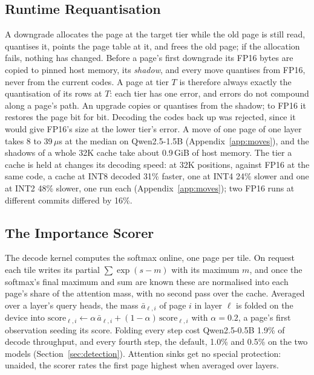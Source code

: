 \documentclass{article}
\begin{document}
\subsection{Runtime Requantisation}
\label{sec:requantisation}

A downgrade allocates the page at the target tier while the old page is still
read, quantises it, points the page table at it, and frees the old page; if
the allocation fails, nothing has changed. Before a page's first downgrade its
FP16 bytes are copied to pinned host memory, its \textit{shadow}, and every
move quantises from FP16, never from the current codes. A page at tier $T$ is
therefore always exactly the quantisation of its rows at $T$: each tier has one
error, and errors do not compound along a page's path. An upgrade copies or
quantises from the shadow; to FP16 it restores the page bit for bit. Decoding
the codes back up was rejected, since it would give FP16's size at the lower
tier's error. A move of one page of one layer takes 8 to 39\,$\mu$s at the
median on Qwen2.5-1.5B (Appendix~\ref{app:moves}), and the shadows of a whole
32K cache take about 0.9\,GiB of host memory. The tier a cache is held at
changes its decoding speed: at 32K positions, against FP16 at the same code, a
cache at INT8 decoded 31\% faster, one at INT4 24\% slower and one at INT2 48\%
slower, one run each (Appendix~\ref{app:moves}); two FP16 runs at different
commits differed by 16\%.

\subsection{The Importance Scorer}
\label{sec:scorer}

The decode kernel computes the softmax online, one page per tile. On
request each tile writes its partial $\sum \exp(s - m)$ with its maximum $m$,
and once the softmax's final maximum and sum are known these are normalised
into each page's share of the attention mass, with no second pass over the
cache. Averaged over a layer's query heads, the mass $\bar a_{\ell,i}$ of page
$i$ in layer $\ell$ is folded on the device into
$\mathrm{score}_{\ell,i} \leftarrow \alpha\,\bar a_{\ell,i} + (1-\alpha)\,
\mathrm{score}_{\ell,i}$ with $\alpha = 0.2$, a page's first observation
seeding its score. Folding every step cost Qwen2.5-0.5B 1.9\% of decode
throughput, and every fourth step, the default, 1.0\% and 0.5\% on the two
models (Section~\ref{sec:detection}). Attention sinks get no special protection: unaided, the scorer
rates the first page highest when averaged over layers.
\end{document}
